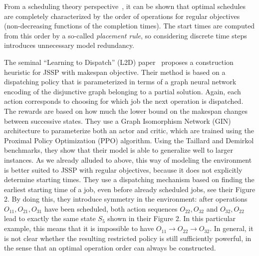 \documentclass[a4paper]{report}
\theoremstyle{definition}
\theoremstyle{plain}
\begin{document}
From a scheduling theory
perspective~\cite{pinedoSchedulingTheoryAlgorithms2016}, it can be shown that
optimal schedules are completely characterized by the order of operations for
regular objectives (non-decreasing functions of the completion times). The start
times are computed from this order by a so-called \textit{placement rule}, so
considering discrete time steps introduces unnecessary model redundancy.


The seminal ``Learning to Dispatch'' (L2D)
paper~\cite{zhangLearningDispatchJob2020} proposes a construction heuristic for
JSSP with makespan objective. Their method is based on a dispatching policy that
is parameterized in terms of a graph neural network encoding of the disjunctive
graph belonging to a partial solution. Again, each action corresponds to
choosing for which job the next operation is dispatched. The rewards are based
on how much the lower bound on the makespan changes between successive states.
They use a Graph Isomorphism Network (GIN) architecture to parameterize both an
actor and critic, which are trained using the Proximal Policy Optimization (PPO)
algorithm. Using the Taillard and Demirkol benchmarks, they show that their
model is able to generalize well to larger instances.
As we already alluded to above, this way of modeling the environment is better
suited to JSSP with regular objectives, because it does not explicitly determine
starting times.
%
They use a dispatching mechanism based on finding the earliest starting time of
a job, even before already scheduled jobs, see their Figure 2. By doing this,
they introduce symmetry in the environment: after operations
$O_{11}, O_{21}, O_{31}$ have been scheduled, both action sequences
$O_{22}, O_{32}$ and $O_{32}, O_{22}$ lead to exactly the same state $S_5$ shown
in their Figure 2. In this particular example, this means that it is impossible
to have $O_{11} \rightarrow O_{22} \rightarrow O_{32}$. In general, it is not
clear whether the resulting restricted policy is still sufficiently powerful, in
the sense that an optimal operation order can always be constructed.

\end{document}
